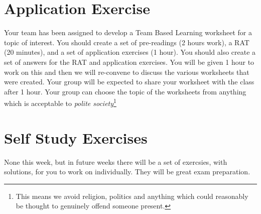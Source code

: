 \documentclass[twoside=false,DIV=14]{scrartcl}
\begin{document}
\newpage
\part*{Application Exercise}
Your team has been assigned to develop a Team Based Learning worksheet for a topic of interest.  You should create a set of pre-readings (2 hours work), a RAT (20 minutes), and a set of application exercises (1 hour).  You should also create a set of answers for the RAT and application exercises.  You will be given 1 hour to work on this and then we will re-convene to discuss the various worksheets that were created.  Your group will be expected to share your worksheet with the class after 1 hour.  Your group can choose the topic of the worksheets from anything which is acceptable to \emph{polite society}\footnote{This means we avoid religion, politics and anything which could reasonably be thought to genuinely offend someone present.}
\newpage
\part*{Self Study Exercises}
None this week, but in future weeks there will be a set of exercsies, with solutions, for you to work on individually.  They will be great exam preparation.
\end{document}
